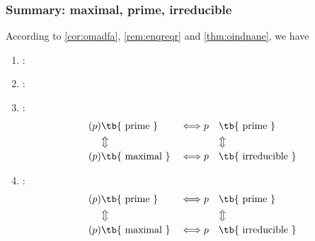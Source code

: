 \documentclass{article}
\begin{document}
\subsubsection{Summary: maximal, prime, irreducible}\label{sec:ownedc}
According to \cref{cor:omadfa}, \cref{rem:enqreqr} and \cref{thm:oindnane}, we have 
\begin{enumerate}
        
    \item {}:

\centerline{}

    \item {}:

\centerline{}

    \item {}:
\begin{alignat*}{3}
    (p) &\text{\tb{ prime }} &&\Longleftrightarrow p &&\text{\tb{ prime }}\\
    &\big\Updownarrow && && \big\Updownarrow \\
    (p) & \text{\tb{ maximal }} &&\Longleftrightarrow p && \text{\tb{ irreducible }}
\end{alignat*}


    \item {}:
\begin{alignat*}{3}
    (p) &\text{\tb{ prime }} &&\Longleftrightarrow p &&\text{\tb{ prime }}\\
    &\big\Updownarrow && && \big\Updownarrow \\
    (p) & \text{\tb{ maximal }} &&\Longleftrightarrow p && \text{\tb{ irreducible }}
\end{alignat*}

\end{enumerate}
\end{document}
